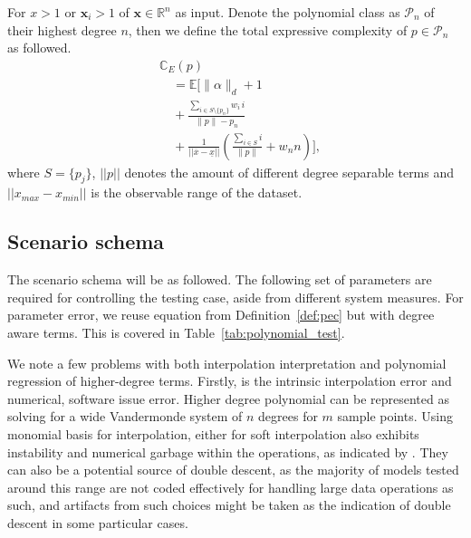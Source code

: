 \documentclass[
  journal=largetwo,
  year=2025,
  volume=37,
]{cup-journal}
\begin{document}
\begin{definition}\label{def:pec}
    For $x>1$ or $\mathbf{x}_{i}>1$ of $\mathbf{x}\in\mathbb{R}^{n}$ as input. Denote the polynomial class as $\mathcal{P}_{n}$ of their highest degree $n$, then we define the total expressive complexity of $p\in \mathcal{P}_{n}$ as followed.
\begin{equation}
    \begin{split}
        &\mathbb{C}_{E}(p)\\
& \quad = \mathbb{E}\!\Bigg[
\|\alpha\|_{d} + 1\\
& \quad + \frac{\sum_{i\in S\setminus\{p_{n}\}} w_i\,i}{\|p\|-p_{n}}\\
&\quad + \frac{1}{||\overline{x}-\underline{x}||}\!\left(
\frac{\sum_{i\in S} i}{\|p\|} + w_{n}n
\right)
\Bigg],
    \end{split}
\end{equation}
    where $S=\{p_{j}\}$, $||p||$ denotes the amount of different degree separable terms and $||x_{max}-x_{min}||$ is the observable range of the dataset. 
\end{definition}

\subsection{Scenario schema}
The scenario schema will be as followed. The following set of parameters are required for controlling the testing case, aside from different system measures. For parameter error, we reuse equation from Definition~\ref{def:pec} but with degree aware terms. This is covered in Table~\ref{tab:polynomial_test}.

We note a few problems with both interpolation interpretation and polynomial regression of higher-degree terms. Firstly, is the intrinsic interpolation error and numerical, software issue error. Higher degree polynomial can be represented as solving for a wide Vandermonde system of $n$ degrees for $m$ sample points. Using monomial basis for interpolation, either for soft interpolation also exhibits instability and numerical garbage within the operations, as indicated by \cite{Shen_2025}. They can also be a potential source of double descent, as the majority of models tested around this range are not coded effectively for handling large data operations as such, and artifacts from such choices might be taken as the indication of double descent in some particular cases. 
\end{document}
